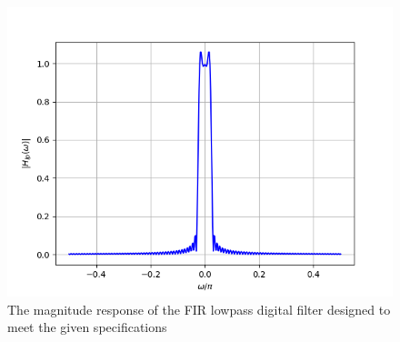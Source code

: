 \documentclass[article]{IEEEtran}
\theoremstyle{remark}
\numberwithin{equation}{subsection}
\begin{document}
\begin{figure}[!ht]
\includegraphics[width = \columnwidth]{figs/fig5.png}
\caption{The magnitude response of the FIR lowpass digital filter designed to meet the given specifications} 
\label{fig5}
\end{figure}
\end{document}

